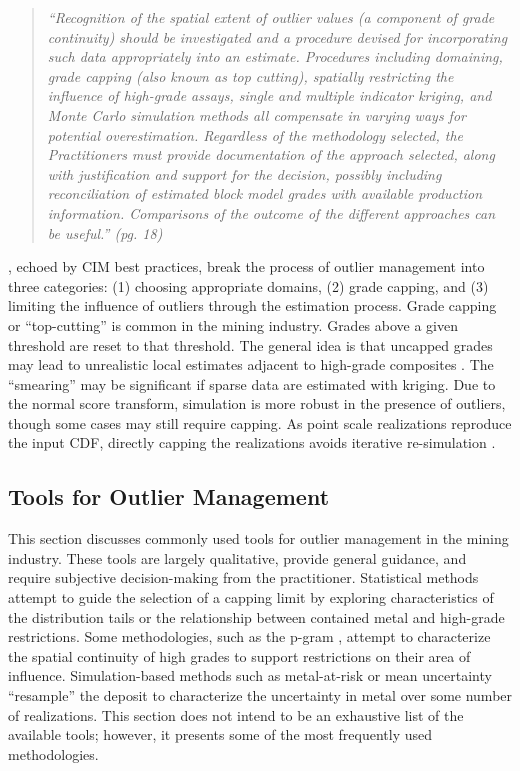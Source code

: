 \blockquote{\textit{``Recognition of the spatial extent of outlier values (a component of grade continuity) should be investigated and a procedure devised for incorporating such data appropriately into an estimate. Procedures including domaining, grade capping (also known as top cutting), spatially restricting the influence of high-grade assays, single and multiple indicator kriging, and Monte Carlo simulation methods all compensate in varying ways for potential overestimation. Regardless of the methodology selected, the Practitioners must provide documentation of the approach selected, along with justification and support for the decision, possibly including reconciliation of estimated block model grades with available production information. Comparisons of the outcome of the different approaches can be useful.'' (pg. 18)}}

\cite{leuangthong2015dealing}, echoed by CIM best practices, break the process of outlier management into three categories: (1) choosing appropriate domains, (2) grade capping, and (3) limiting the influence of outliers through the estimation process. Grade capping or ``top-cutting'' is common in the mining industry. Grades above a given threshold are reset to that threshold. The general idea is that uncapped grades may lead to unrealistic local estimates adjacent to high-grade composites \citep{nowak2013suggestions}. The ``smearing'' may be significant if sparse data are estimated with kriging. Due to the normal score transform, simulation is more robust in the presence of outliers, though some cases may still require capping. As point scale realizations reproduce the input \gls{CDF}, directly capping the realizations avoids iterative re-simulation \citep{harding2023probabilistic}.

\FloatBarrier
\subsection{Tools for Outlier Management}
\label{subsec:02tools}

This section discusses commonly used tools for outlier management in the mining industry. These tools are largely qualitative, provide general guidance, and require subjective decision-making from the practitioner. Statistical methods attempt to guide the selection of a capping limit by exploring characteristics of the distribution tails or the relationship between contained metal and high-grade restrictions. Some methodologies, such as the p-gram \citep{nowak2019optimal}, attempt to characterize the spatial continuity of high grades to support restrictions on their area of influence. Simulation-based methods such as metal-at-risk \citep{parker2006} or mean uncertainty \citep{nowak2013suggestions} ``resample'' the deposit to characterize the uncertainty in metal over some number of realizations. This section does not intend to be an exhaustive list of the available tools; however, it presents some of the most frequently used methodologies.

